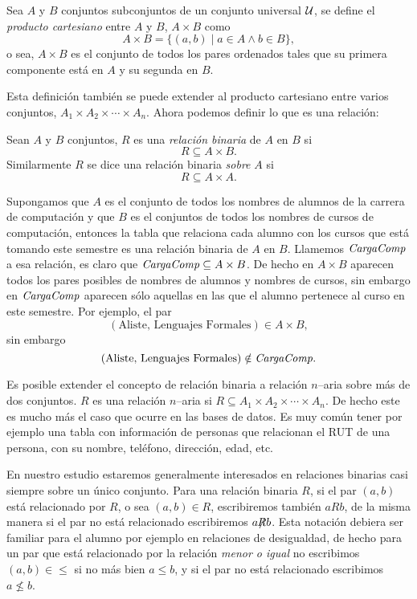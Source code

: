 \begin{definicion}
Sea $A$ y $B$ conjuntos subconjuntos de un conjunto universal $\mathcal{U}$, se define el \emph{producto cartesiano} entre $A$ y $B$, $A\times B$ como
\[
A\times B=\{(a,b)\;|\;a\in A\wedge b\in B\},
\]
o sea, $A\times B$ es el conjunto de todos los pares ordenados tales que su primera componente está en $A$ y su segunda en $B$.
\end{definicion}
Esta definición también se puede extender al producto cartesiano entre varios conjuntos, $A_1\times A_2\times\cdots\times A_n$.
Ahora podemos definir lo que es una relación:

\begin{definicion}
Sean $A$ y $B$ conjuntos, $R$ es una \emph{relación binaria} de $A$ en $B$ si 
\[
R\subseteq A\times B.
\]
Similarmente $R$ se dice una relación binaria \emph{sobre} $A$ si
\[
R\subseteq A\times A.
\]
\end{definicion}

\begin{ejemplo}
Supongamos que $A$ es el conjunto de todos los nombres de alumnos de la carrera de computación y que $B$ es el conjuntos de todos los nombres de cursos de computación, entonces la tabla que relaciona cada alumno con los cursos que está tomando este semestre es una relación binaria de $A$ en $B$.
Llamemos ${\it CargaComp}$ a esa relación, es claro que ${\it CargaComp}\subseteq A\times B$.
De hecho en $A\times B$ aparecen todos los pares posibles de nombres de alumnos y nombres de cursos, sin embargo en ${\it CargaComp}$ aparecen sólo aquellas en las que el alumno pertenece al curso en este semestre.
Por ejemplo, el par 
\[
(\text{Aliste, Lenguajes Formales})\in A\times B,
\]
sin embargo 
\[
(\text{Aliste, Lenguajes Formales})\notin {\it CargaComp}.
\]
\end{ejemplo}

Es posible extender el concepto de relación binaria a relación $n$--aria sobre más de dos conjuntos.
$R$ es una relación $n$--aria si $R\subseteq A_1\times A_2\times\cdots\times A_n$.
De hecho este es mucho más el caso que ocurre en las bases de datos.
Es muy común tener por ejemplo una tabla con información de personas que relacionan el RUT de una persona, con su nombre, teléfono, dirección, edad, etc.

En nuestro estudio estaremos generalmente interesados en relaciones binarias casi siempre sobre un único conjunto.
Para una relación binaria $R$, si el par $(a,b)$ está relacionado por $R$, o sea $(a,b)\in R$, escribiremos también $aRb$, de la misma manera si el par no está relacionado escribiremos $a\hspace*{-0.3em}\not\hspace*{-0.3em}Rb$.
Esta notación debiera ser familiar para el alumno por ejemplo en relaciones de desigualdad, de hecho para un par que está relacionado por la relación \emph{menor o igual} no escribimos $(a,b)\in\leq$ si no más bien $a\leq b$, y si el par no está relacionado escribimos $a\not\leq b$.

